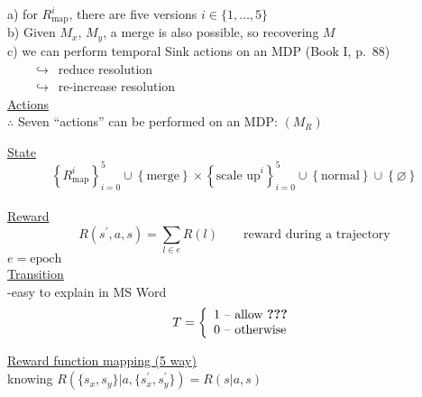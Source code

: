 a) for $R^{i}_{\textrm{map}}$, there are five versions $i\in\{1,\ldots,5\}$\\
b) Given $M_x$, $M_y$, a merge is also possible, so recovering $M$\\
c) we can perform temporal Sink actions on an MDP (Book I, p.\ 88)\\
${}\qquad\hookrightarrow$\ reduce resolution\\
${}\qquad\hookrightarrow$\ re-increase resolution\\

\underline{Actions}\\

$\therefore$ Seven ``actions'' can be performed on an MDP: $(M_R)$\\

$\qquad$\begin{minipage}[t]{0.9\textwidth}
\underline{State}\\

\begin{equation*}
\left\{R^i_{\textrm{map}}\right\}_{i=0}^{5}\cup \left\{\text{merge}\right\}\times\left\{\text{scale\ up}^{i}\right\}_{i=0}^{5}\cup\left\{\text{normal}\right\}\cup\left\{\varnothing\right\}
\end{equation*}\\

\underline{Reward}\\

\begin{equation*}
R(s^\prime,a,s)=\sum_{l\in e}R(l)\qquad\text{reward during a trajectory}
\end{equation*}
$e=\text{epoch}$\\

\underline{Transition}\\

-easy to explain in MS Word
\begin{equation*}
T=\left\{
\begin{array}{l}
1\ \text{-- allow \textbf{???}}\\
0\ \text{-- otherwise}
\end{array}
\right.
\end{equation*}
\end{minipage}

\newpage


\underline{Reward function mapping (5 way)}\\

knowing $R\left(\{s_x, s_y\}|a, \{s^\prime_x,s^\prime_y\}\right)=R(s|a,s)$\\


